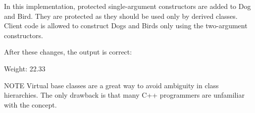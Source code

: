 In this implementation, protected single-argument constructors are added to Dog and Bird. They are protected as they should be used only by derived classes. Client code is allowed to construct Dogs and Birds only using the two-argument constructors.

After these changes, the output is correct:

\begin{shell}
Weight: 22.33
\end{shell}

\begin{myNotic}{NOTE}
Virtual base classes are a great way to avoid ambiguity in class hierarchies. The only drawback is that many C++ programmers are unfamiliar with the concept.
\end{myNotic}











